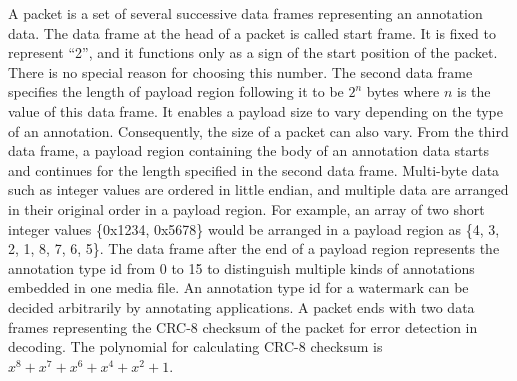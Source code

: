 A packet is a set of several successive data frames representing an annotation data.
The data frame at the head of a packet is called start frame. It is fixed to represent ``2'', and it functions only as a sign of the start position of the packet. There is no special reason for choosing this number.
The second data frame specifies the length of payload region following it to be $ 2^n $ bytes where $n$ is the value of this data frame. It enables a payload size to vary depending on the type of an annotation. Consequently, the size of a packet can also vary.
From the third data frame, a payload region containing the body of an annotation data starts and continues for the length specified in the second data frame.
Multi-byte data such as integer values are ordered in little endian, and multiple data are arranged in their original order in a payload region.
For example, an array of two short integer values \{0x1234, 0x5678\} would be arranged in a payload region as \{4, 3, 2, 1, 8, 7, 6, 5\}.
The data frame after the end of a payload region represents the annotation type id from 0 to 15 to distinguish multiple kinds of annotations embedded in one media file.
An annotation type id for a watermark can be decided arbitrarily by annotating applications.
A packet ends with two data frames representing the CRC-8 checksum of the packet for error detection in decoding. The polynomial for calculating CRC-8 checksum is $x^8 + x^7 + x^6 + x^4 + x^2 + 1$.
